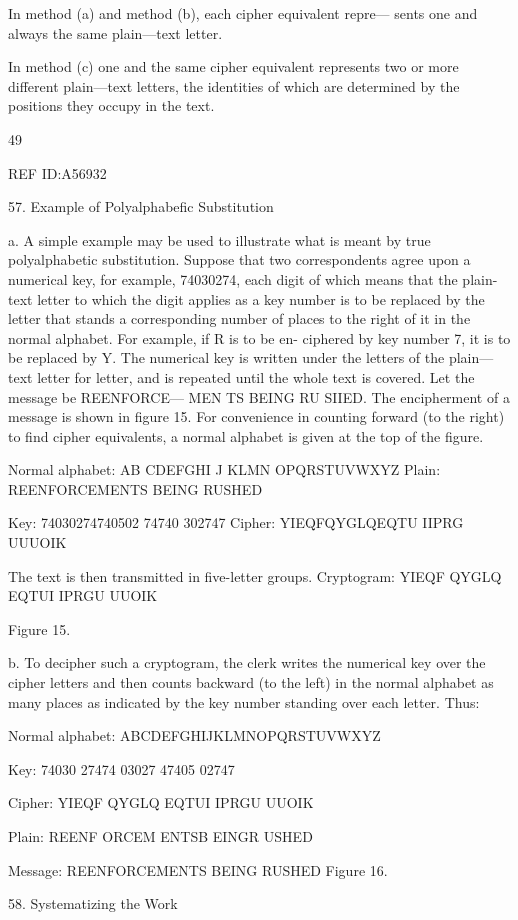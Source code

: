 {{{In method (a) and method (b), each cipher equivalent repre—
sents one and always the same plain—text letter.

In method (c) one and the same cipher equivalent represents
two or more different plain—text letters, the identities of
which are determined by the positions they occupy in the
text.

49

 

REF ID:A56932

57. Example of Polyalphabeﬁc Substitution

a. A simple example may be used to illustrate what is meant by true
polyalphabetic substitution. Suppose that two correspondents agree upon
a numerical key, for example, 74030274, each digit of which means
that the plain-text letter to which the digit applies as a key number is to
be replaced by the letter that stands a corresponding number of places to
the right of it in the normal alphabet. For example, if R is to be en-
ciphered by key number 7, it is to be replaced by Y. The numerical key is
written under the letters of the plain—text letter for letter, and is repeated
until the whole text is covered. Let the message be REENFORCE—
MEN TS BEING RU SIIED. The encipherment of a message is shown
in ﬁgure 15. For convenience in counting forward (to the right) to ﬁnd
cipher equivalents, a normal alphabet is given at the top of the ﬁgure.

Normal alphabet: AB CDEFGHI J KLMN OPQRSTUVWXYZ
Plain: REENFORCEMENTS BEING RUSHED

Key: 74030274740502 74740 302747
Cipher: YIEQFQYGLQEQTU IIPRG UUUOIK

The text is then transmitted in ﬁve-letter groups.
Cryptogram: YIEQF QYGLQ EQTUI IPRGU UUOIK

Figure 15.

b. To decipher such a cryptogram, the clerk writes the numerical key
over the cipher letters and then counts backward (to the left) in the
normal alphabet as many places as indicated by the key number standing
over each letter. Thus:

Normal alphabet: ABCDEFGHIJKLMNOPQRSTUVWXYZ

Key: 74030 27474 03027 47405 02747

Cipher: YIEQF QYGLQ EQTUI IPRGU UUOIK

Plain: REENF ORCEM ENTSB EINGR USHED

Message: REENFORCEMENTS BEING RUSHED
Figure 16.

58. Systematizing the Work

}}}
